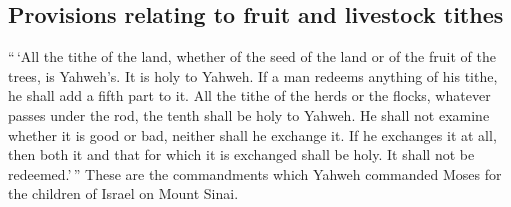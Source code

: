 \hypertarget{provisions-relating-to-fruit-and-livestock-tithes}{%
\subsection{Provisions relating to fruit and livestock
tithes}\label{provisions-relating-to-fruit-and-livestock-tithes}}

 ``\,`All the tithe of the land, whether of the seed of
the land or of the fruit of the trees, is Yahweh's. It is holy to
Yahweh.  If a man redeems anything of his tithe, he shall
add a fifth part to it.  All the tithe of the herds or
the flocks, whatever passes under the rod, the tenth shall be holy to
Yahweh.  He shall not examine whether it is good or bad,
neither shall he exchange it. If he exchanges it at all, then both it
and that for which it is exchanged shall be holy. It shall not be
redeemed.'\,''  These are the commandments which Yahweh
commanded Moses for the children of Israel on Mount Sinai.
